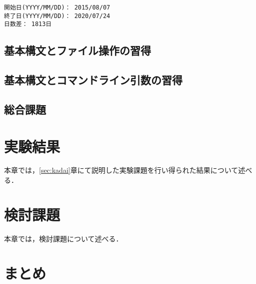 \documentclass[uplatex,dvipdfmx,12pt]{jsarticle}
\begin{document}
\begin{lstlisting}[caption={日数計算プログラムの出力例},label=dayPro]
開始日(YYYY/MM/DD)： 2015/08/07
終了日(YYYY/MM/DD)： 2020/07/24
日数差： 1813日
\end{lstlisting}

\subsection{基本構文とファイル操作の習得}

\subsection{基本構文とコマンドライン引数の習得}

\subsection{総合課題}
\newpage
\section{実験結果}
本章では，\ref{sec:kadai}章にて説明した実験課題を行い得られた結果について述べる．



\newpage

\section{検討課題}
本章では，検討課題について述べる．



\newpage
\section{まとめ}

\newpage
\begin{thebibliography}{99}

\end{thebibliography}
\end{document}

